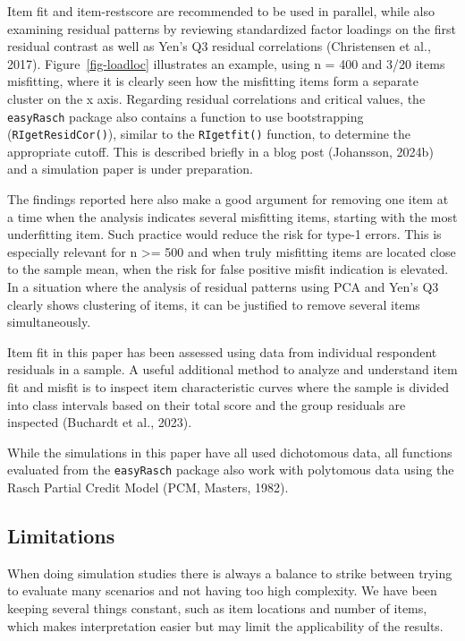 \documentclass[
  letterpaper,
  DIV=11,
  numbers=noendperiod]{scrartcl}
\begin{document}
Item fit and item-restscore are recommended to be used in parallel,
while also examining residual patterns by reviewing standardized factor
loadings on the first residual contrast as well as Yen's Q3 residual
correlations (Christensen et al., 2017). Figure~\ref{fig-loadloc}
illustrates an example, using n = 400 and 3/20 items misfitting, where
it is clearly seen how the misfitting items form a separate cluster on
the x axis. Regarding residual correlations and critical values, the
\texttt{easyRasch} package also contains a function to use bootstrapping
(\texttt{RIgetResidCor()}), similar to the \texttt{RIgetfit()} function,
to determine the appropriate cutoff. This is described briefly in a blog
post (Johansson, 2024b) and a simulation paper is under preparation.

The findings reported here also make a good argument for removing one
item at a time when the analysis indicates several misfitting items,
starting with the most underfitting item. Such practice would reduce the
risk for type-1 errors. This is especially relevant for n \textgreater=
500 and when truly misfitting items are located close to the sample
mean, when the risk for false positive misfit indication is elevated. In
a situation where the analysis of residual patterns using PCA and Yen's
Q3 clearly shows clustering of items, it can be justified to remove
several items simultaneously.

Item fit in this paper has been assessed using data from individual
respondent residuals in a sample. A useful additional method to analyze
and understand item fit and misfit is to inspect item characteristic
curves where the sample is divided into class intervals based on their
total score and the group residuals are inspected (Buchardt et al.,
2023).

While the simulations in this paper have all used dichotomous data, all
functions evaluated from the \texttt{easyRasch} package also work with
polytomous data using the Rasch Partial Credit Model (PCM, Masters,
1982).

\subsection{Limitations}\label{limitations}

When doing simulation studies there is always a balance to strike
between trying to evaluate many scenarios and not having too high
complexity. We have been keeping several things constant, such as item
locations and number of items, which makes interpretation easier but may
limit the applicability of the results.
\end{document}
